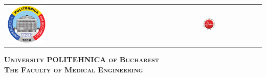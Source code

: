 



\begin{titlepage}
	\centering
	\begin{tabular}{p{6cm}p{3.3cm}}
		\includegraphics[width=0.2\textwidth]{img/upb.png} &
		\includegraphics[width=0.21\textwidth]{img/fim.png}
	\end{tabular}
	\vspace{1cm}

	{\scshape\Large \textbf{University POLITEHNICA of Bucharest} \\}
	{\scshape\Large \textbf{The Faculty of Medical Engineering} \\}
	
\end{titlepage}

